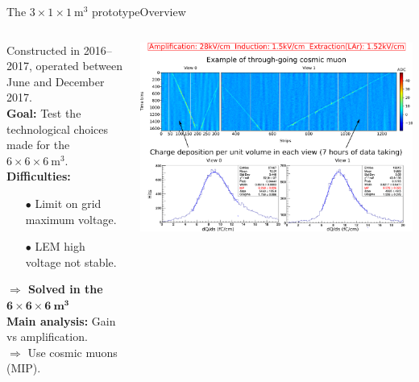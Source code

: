 \documentclass[10pt]{beamer}
\begin{document}
    \begin{frame}{The \texorpdfstring{$3 \times 1 \times \SI{1}{\meter\cubed}$}{311} prototype}{Overview}
    	\begin{scriptsize}
    		\vfill
    		\begin{columns}
    			\begin{column}{0.4\textwidth}
    				Constructed in 2016--2017, operated between June and December 2017.\\
    				\vspace{0.3cm}
    				\textbf{Goal:} Test the technological choices made for the $6 \times 6 \times \SI{6}{\meter\cubed}$.\\
    				\vspace{0.3cm}
    				\textbf{Difficulties:} 
    				\begin{itemize}
    					\item[$\bullet$] Limit on grid maximum voltage.
    					\item[$\bullet$] LEM high voltage not stable.
    				\end{itemize}
    				\textbf{$\Rightarrow$ Solved in the $\mathbf{6 \times 6 \times \SI[detect-weight
    						]{6}{\meter\cubed}}$}\\
    				\vspace{0.3cm}
    				\textbf{Main analysis:} Gain vs amplification.\\
    				$\Rightarrow$ Use cosmic muons (MIP).
    			\end{column}\hfill
    			\begin{column}{0.6\textwidth}
    				\includegraphics[width=\textwidth]{figures/311/run840.png}\\
    			\end{column}
    		\end{columns}
	    \end{scriptsize}
    \end{frame}
    
\end{document}

